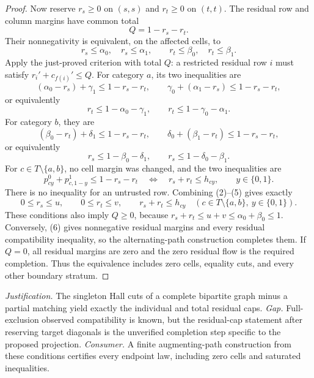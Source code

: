 \documentclass{article}
\begin{document}
\begin{proof}
Now reserve \(r_s\ge0\) on \((s,s)\) and \(r_t\ge0\) on \((t,t)\).  The residual row and column margins have common total
\[
 Q=1-r_s-r_t.
\]
Their nonnegativity is equivalent, on the affected cells, to
\[
 r_s\le\alpha_0,\quad r_s\le\alpha_1,\qquad
 r_t\le\beta_0,\quad r_t\le\beta_1. \tag{2}
\]
Apply the just-proved criterion with total \(Q\): a restricted residual row \(i\) must satisfy \(r_i'+c_{f(i)}'\le Q\).  For category \(a\), its two inequalities are
\[
 (\alpha_0-r_s)+\gamma_1\le1-r_s-r_t,\qquad
 \gamma_0+(\alpha_1-r_s)\le1-r_s-r_t,
\]
or equivalently
\[
 r_t\le1-\alpha_0-\gamma_1,\qquad
 r_t\le1-\gamma_0-\alpha_1. \tag{3}
\]
For category \(b\), they are
\[
 (\beta_0-r_t)+\delta_1\le1-r_s-r_t,\qquad
 \delta_0+(\beta_1-r_t)\le1-r_s-r_t,
\]
or equivalently
\[
 r_s\le1-\beta_0-\delta_1,\qquad
 r_s\le1-\delta_0-\beta_1. \tag{4}
\]
For \(c\in T\setminus\{a,b\}\), no cell margin was changed, and the two inequalities are
\[
 p^0_{cy}+p^1_{c,1-y}\le1-r_s-r_t
 \quad\Longleftrightarrow\quad r_s+r_t\le h_{cy},\qquad y\in\{0,1\}. \tag{5}
\]
There is no inequality for an untrusted row.  Combining (2)--(5) gives exactly
\[
 0\le r_s\le u,\qquad 0\le r_t\le v,\qquad
 r_s+r_t\le h_{cy}\quad(c\in T\setminus\{a,b\},\ y\in\{0,1\}). \tag{6}
\]
These conditions also imply \(Q\ge0\), because \(r_s+r_t\le u+v\le\alpha_0+\beta_0\le1\).  Conversely, (6) gives nonnegative residual margins and every residual compatibility inequality, so the alternating-path construction completes them.  If \(Q=0\), all residual margins are zero and the zero residual flow is the required completion.  Thus the equivalence includes zero cells, equality cuts, and every other boundary stratum.
\end{proof}
\par\smallskip\noindent \textit{Justification.} The singleton Hall cuts of a complete bipartite graph minus a partial matching yield exactly the individual and total residual caps. \textit{Gap.} Full-exclusion observed compatibility is known, but the residual-cap statement after reserving target diagonals is the unverified completion step specific to the proposed projection. \textit{Consumer.} A finite augmenting-path construction from these conditions certifies every endpoint law, including zero cells and saturated inequalities.
\end{document}
